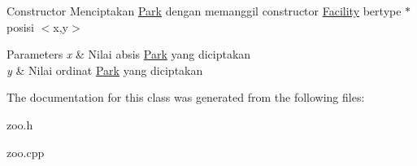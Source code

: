 Constructor Menciptakan \hyperlink{classPark}{Park} dengan memanggil constructor \hyperlink{classFacility}{Facility} bertype \textquotesingle{}$\ast$\textquotesingle{} posisi $<$x,y$>$ 


\begin{DoxyParams}{Parameters}
{\em x} & Nilai absis \hyperlink{classPark}{Park} yang diciptakan \\
\hline
{\em y} & Nilai ordinat \hyperlink{classPark}{Park} yang diciptakan \\
\hline
\end{DoxyParams}


The documentation for this class was generated from the following files\+:\begin{DoxyCompactItemize}
\item 
zoo.\+h\item 
zoo.\+cpp\end{DoxyCompactItemize}
